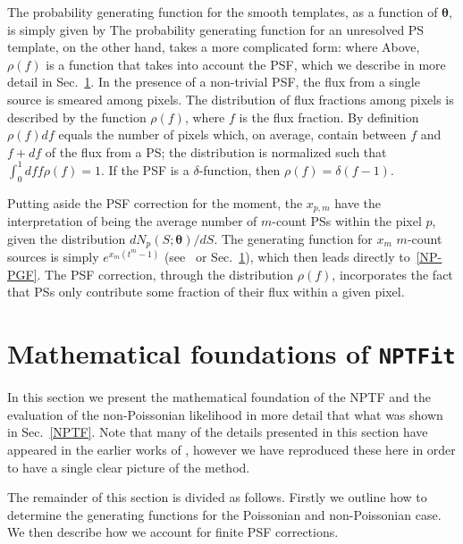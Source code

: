 The probability generating function for the smooth templates, as a function of ${\bm \theta}$, is simply given by
The probability generating function for an unresolved PS template, on the other hand, takes a more complicated form:
where
Above, $\rho(f)$ is a function that takes into account the PSF, which we describe in more detail in Sec.~\ref{details}.  In the presence of a non-trivial PSF, the flux from a single source is smeared among pixels.  The distribution of flux fractions among pixels is described by the function $\rho(f)$, where $f$ is the flux fraction.  By definition $\rho(f) df$ equals the number of pixels which, on average, contain between $f$ and $f+ df$ of the flux from a PS; the distribution is normalized such that $ \int_0^1 df f \rho(f) = 1$.  If the PSF is a $\delta$-function, then $\rho(f) = \delta(f-1)$.

Putting aside the PSF correction for the moment, the $x_{p,m}$ have the interpretation of being the average number of $m$-count PSs within the pixel $p$, given the distribution $ dN_p(S;{\bm \theta})/dS $.  The generating function for $x_m$ $m$-count sources is simply $e^{x_m(t^m - 1)}$ (see~\cite{Malyshev:2011zi} or Sec.~\ref{details}), which then leads directly to~\eqref{NP-PGF}.  The PSF correction, through the distribution $\rho(f)$, incorporates the fact that PSs only contribute some fraction of their flux within a given pixel.

\section{Mathematical foundations of \texttt{NPTFit}}
\label{details}

In this section we present the mathematical foundation of the NPTF and the evaluation of the non-Poissonian likelihood in more detail that what was shown in Sec.~\ref{NPTF}. Note that many of the details presented in this section have appeared in the earlier works of \cite{Malyshev:2011zi,Lee:2014mza,Lee:2015fea}, however we have reproduced these here in order to have a single clear picture of the method.

The remainder of this section is divided as follows. Firstly we outline how to determine the generating functions for the Poissonian and non-Poissonian case. We then describe how we account for finite PSF corrections.

